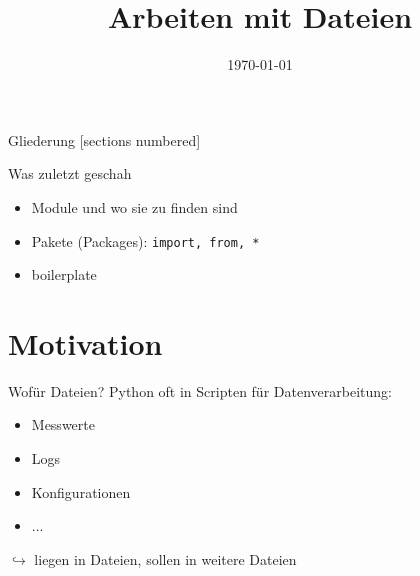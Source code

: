 



\title{Arbeiten mit Dateien}
\date{\today}

\usepackage{tikz} \usetikzlibrary{arrows, positioning}







\maketitle

\begin{frame}{Gliederung}
    [sections numbered]
    \tableofcontents
\end{frame}

\begin{frame}{Was zuletzt geschah}
	\begin{itemize}
		\item Module und wo sie zu finden sind
		\item Pakete (Packages): \texttt{import, from, *}
		\item boilerplate
	\end{itemize}
\end{frame}

\section{Motivation}

\begin{frame}{Wofür Dateien?}
	Python oft in Scripten für Datenverarbeitung:
    \begin{itemize}
        \item Messwerte
        \item Logs
        \item Konfigurationen
        \item ...
    \end{itemize}
    $\hookrightarrow$ liegen in Dateien, sollen in weitere Dateien
\end{frame}


